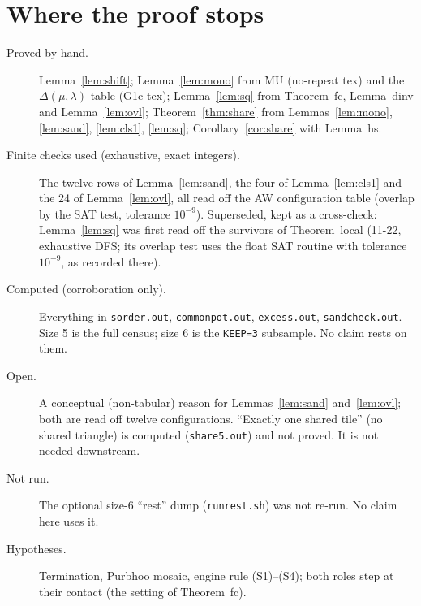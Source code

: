 \documentclass[11pt]{article}
\theoremstyle{definition}\newtheorem{definition}[theorem]{Definition}\newtheorem{remark}[theorem]{Remark}
\begin{document}
\section{Where the proof stops}\label{sec:gaps}
\begin{description}
\item[Proved by hand.] Lemma~\ref{lem:shift}; Lemma~\ref{lem:mono} from MU (no-repeat tex) and the $\Delta(\mu,\lambda)$ table (G1c tex); Lemma~\ref{lem:sq} from Theorem~fc, Lemma~dinv and Lemma~\ref{lem:ovl}; Theorem~\ref{thm:share} from Lemmas~\ref{lem:mono}, \ref{lem:sand}, \ref{lem:cls1}, \ref{lem:sq}; Corollary~\ref{cor:share} with Lemma~hs.
\item[Finite checks used (exhaustive, exact integers).] The twelve rows of Lemma~\ref{lem:sand}, the four of Lemma~\ref{lem:cls1} and the 24 of Lemma~\ref{lem:ovl}, all read off the AW configuration table (overlap by the SAT test, tolerance $10^{-9}$). Superseded, kept as a cross-check: Lemma~\ref{lem:sq} was first read off the survivors of Theorem~local (11-22, exhaustive DFS; its overlap test uses the float SAT routine with tolerance $10^{-9}$, as recorded there).
\item[Computed (corroboration only).] Everything in \texttt{sorder.out}, \texttt{commonpot.out}, \texttt{excess.out}, \texttt{sandcheck.out}. Size 5 is the full census; size 6 is the \texttt{KEEP=3} subsample. No claim rests on them.
\item[Open.] A conceptual (non-tabular) reason for Lemmas~\ref{lem:sand} and~\ref{lem:ovl}; both are read off twelve configurations. ``Exactly one shared tile'' (no shared triangle) is computed (\texttt{share5.out}) and not proved. It is not needed downstream.
\item[Not run.] The optional size-6 ``rest'' dump (\texttt{runrest.sh}) was not re-run. No claim here uses it.
\item[Hypotheses.] Termination, Purbhoo mosaic, engine rule (S1)--(S4); both roles step at their contact (the setting of Theorem~fc).
\end{description}
\end{document}
